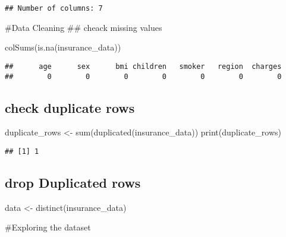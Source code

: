 \documentclass[
]{article}
\newenvironment{Shaded}{\begin{snugshade}}{\end{snugshade}}
\newcommand{\FunctionTok}[1]{\textcolor[rgb]{0.00,0.00,0.00}{#1}}
\newcommand{\NormalTok}[1]{#1}
\newcommand{\OtherTok}[1]{\textcolor[rgb]{0.56,0.35,0.01}{#1}}
\begin{document}
\begin{verbatim}
## Number of columns: 7
\end{verbatim}

\#Data Cleaning \#\# cheack missing values

\begin{Shaded}
\begin{Highlighting}[]
\FunctionTok{colSums}\NormalTok{(}\FunctionTok{is.na}\NormalTok{(insurance\_data))}
\end{Highlighting}
\end{Shaded}

\begin{verbatim}
##      age      sex      bmi children   smoker   region  charges 
##        0        0        0        0        0        0        0
\end{verbatim}

\hypertarget{check-duplicate-rows}{%
\subsection{check duplicate rows}\label{check-duplicate-rows}}

\begin{Shaded}
\begin{Highlighting}[]
\NormalTok{duplicate\_rows }\OtherTok{\textless{}{-}} \FunctionTok{sum}\NormalTok{(}\FunctionTok{duplicated}\NormalTok{(insurance\_data))}
\FunctionTok{print}\NormalTok{(duplicate\_rows)}
\end{Highlighting}
\end{Shaded}

\begin{verbatim}
## [1] 1
\end{verbatim}

\hypertarget{drop-duplicated-rows}{%
\subsection{drop Duplicated rows}\label{drop-duplicated-rows}}

\begin{Shaded}
\begin{Highlighting}[]
\NormalTok{data }\OtherTok{\textless{}{-}} \FunctionTok{distinct}\NormalTok{(insurance\_data)}
\end{Highlighting}
\end{Shaded}

\#Exploring the dataset
\end{document}
